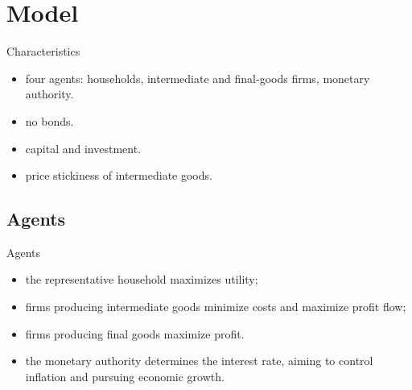 \documentclass[../quali_slides.tex]{subfiles}
\begin{document}
\section{Model}


\begin{frame}{Characteristics}
	
	\begin{itemize}
		
		\item four agents: households, intermediate and final-goods firms, monetary authority.
		
		\item no bonds.
		
		\item capital and investment.
		
		\item price stickiness of intermediate goods.
		
	\end{itemize}
	
\end{frame}
	

	\subsection{Agents}
	
	\begin{frame}{Agents}

	\begin{itemize}
	
	\item the representative household maximizes utility;
	
	\item firms producing intermediate goods minimize costs and maximize profit flow;
	
	\item firms producing final goods maximize profit.

	\item the monetary authority determines the interest rate, aiming to control inflation and pursuing economic growth.
	
	\end{itemize}		

	\end{frame}
\end{document}

